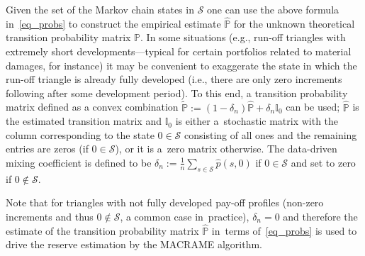 Given the set of the Markov chain states in $\mathcal{S}$ one can use the above formula in~\eqref{eq_probs} %
to construct the empirical estimate $\widehat{\mathbb{P}}$ for the unknown theoretical transition probability matrix $\mathbb{P}$. In some situations (e.g., run-off triangles with extremely short developments---typical for certain portfolios related to material damages, for instance) it may be convenient to exaggerate the state in which the run-off triangle
is already fully developed (i.e., there are only zero increments following after some development period). To this end, a transition probability matrix defined as a convex combination
$\widetilde{\mathbb{P}}:=(1-\delta_n)\widehat{\mathbb{P}}+\delta_n\mathbb{I}_0$ can be used; $\widehat{\mathbb{P}}$ is the estimated transition matrix and $\mathbb{I}_0$ is either a~stochastic matrix with the column corresponding to the state $0\in\mathcal{S}$ consisting of all ones 
and the remaining entries are zeros (if $0\in\mathcal{S}$), or it is a~zero matrix otherwise. The data-driven mixing coefficient  is defined to be
$\delta_n:= 
\frac{1}{n}\sum_{s\in\mathcal{S}}\widehat{p}(s,0)$ if $0\in \mathcal{S}$ and set to zero if $0\notin \mathcal{S}$.

Note that for triangles with not fully developed pay-off profiles (non-zero increments and thus $0 \notin \mathcal{S}$, a common case in~practice), $\delta_n=0$ and therefore the estimate of the transition probability matrix $\widehat{\mathbb{P}}$ in~terms of~\eqref{eq_probs} is used to drive the reserve estimation by the MACRAME algorithm. 

